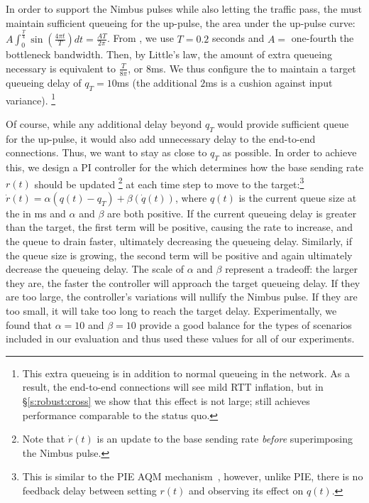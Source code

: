 In order to support the Nimbus pulses while also letting the traffic pass,
the \inbox must maintain sufficient queueing for the up-pulse,
\ie the area under the up-pulse curve: 
$A \int_0^{\frac{T}{4}} \sin(\frac{4\pi{}t}{T}) dt = \frac{AT}{2\pi}$.
From \cite{nimbus-arxiv}, we use $T = 0.2$ seconds and $A =$ one-fourth the bottleneck bandwidth. Then, by Little's law, the amount of extra queueing necessary is equivalent to
$\frac{T}{8\pi}$, or $8$ms. %
We thus configure the \inbox to maintain a target queueing delay of $q_T = 10$ms (the additional $2$ms is a cushion against input variance).
\footnote{This extra queueing is in addition to normal queueing in the network. As a result, the end-to-end connections will see mild RTT inflation, but in \S\ref{s:robust:cross} we show that this effect is not large; \name still achieves performance comparable to the status quo.}

Of course, while any additional delay beyond $q_T$ would provide sufficient queue for the up-pulse, it would also add unnecessary delay to the end-to-end connections. Thus, we want to stay as close to $q_T$ as possible. In order to achieve this,
we design a PI controller for the \inbox which determines how the base sending rate $r(t)$ should be updated
\footnote{Note that $\dot{r}(t)$ is an update to the base sending rate \emph{before} superimposing the Nimbus pulse.}
at each time step to move to the target:\footnote{This is similar to the PIE AQM mechanism~\cite{pie}, however, unlike PIE, there is no feedback delay between setting $r(t)$ and observing its effect on $q(t)$.}
$\dot{r}(t) = \alpha (q(t) - q_T) + \beta (\dot{q}(t))$, where $q(t)$ is the current queue size at the \inbox in ms and $\alpha$ and $\beta$ are both positive.
If the current queueing delay is greater than the target, the first term will be positive, causing the rate to increase, and the queue to drain faster, ultimately decreasing the queueing delay. Similarly, if the queue size is growing, the second term will be positive and again ultimately decrease the queueing delay. The scale of $\alpha$ and $\beta$ represent a tradeoff: the larger they are, the faster the controller will approach the target queueing delay. If they are too large, the controller's variations will nullify the Nimbus pulse. If they are too small, it will take too long to reach the target delay. Experimentally, we found that $\alpha=10$ and $\beta = 10$ provide a good balance for the types of scenarios included in our evaluation and thus used these values for all of our experiments.


